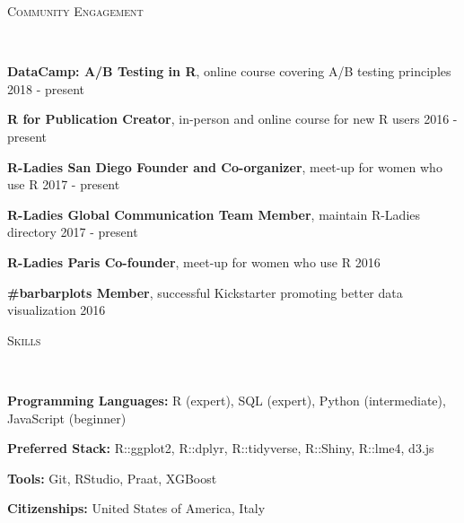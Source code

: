 \documentclass[9pt]{article}
\newenvironment{changemargin}[2]{%
  \begin{list}{}{%
    \setlength{\topsep}{0pt}%
    \setlength{\leftmargin}{#1}%
    \setlength{\rightmargin}{#2}%
    \setlength{\listparindent}{\parindent}%
    \setlength{\itemindent}{\parindent}%
    \setlength{\parsep}{\parskip}%
  }%
  \item[]}{\end{list}
}
\newcommand{\lineover}{
	\begin{changemargin}{-0.05in}{-0.05in}
		\vspace*{-8pt}
		\hrulefill \\
		\vspace*{-2pt}
	\end{changemargin}
}
\newcommand{\header}[1]{
	\begin{changemargin}{-0.5in}{-0.5in}
		\scshape{#1}\\
  	\lineover
	\end{changemargin}
}
\newenvironment{body} {
	\vspace*{-16pt}
	\begin{changemargin}{-0.25in}{-0.5in}
  }	
	{\end{changemargin}
}
\begin{document}
\header{\color{red}Community Engagement}

\begin{body}
	\vspace{14pt}
	
	\textbf{DataCamp: A/B Testing in R}, online course covering A/B testing principles \hfill 2018 - present\\
	\medskip
	
	\textbf{R for Publication Creator}, in-person and online course for new R users \hfill 2016 - present\\
	\medskip
	
	\textbf{R-Ladies San Diego Founder and Co-organizer}, meet-up for women who use R \hfill 2017 - present\\
	\medskip
	
	\textbf{R-Ladies Global Communication Team Member}, maintain R-Ladies directory \hfill 2017 - present\\
	\medskip
	
	\textbf{R-Ladies Paris Co-founder}, meet-up for women who use R \hfill 2016\\
	\medskip

	\textbf{\#barbarplots Member}, successful Kickstarter promoting better data visualization \hfill 2016\\
	\medskip
		
\end{body}

\smallskip

\header{\color{red}Skills}

\begin{body}
	\vspace{14pt}
	
	
	\textbf{Programming Languages:} R (expert), SQL (expert), Python (intermediate), JavaScript (beginner)\
	\medskip

	\textbf{Preferred Stack:} R::ggplot2, R::dplyr, R::tidyverse, R::Shiny, R::lme4, d3.js\\
	\medskip
	
	\textbf{Tools:} Git, RStudio, Praat, XGBoost
	\medskip
	
	\textbf{Citizenships:} United States of America, Italy\\
	\medskip

\end{body}
\end{document}
